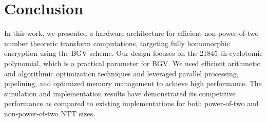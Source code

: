 \documentclass[lettersize,journal]{IEEEtran}
\begin{document}
\section{Conclusion}
In this work, we presented a hardware architecture for efficient non-power-of-two number theoretic transform computations, targeting fully homomorphic encryption using the BGV scheme. Our design focuses on the 21845-th cyclotomic polynomial, which is a practical parameter for BGV. We used efficient arithmetic
and algorithmic optimization techniques and leveraged parallel processing, pipelining, and optimized memory management to achieve high performance. The simulation and implementation results have demonstrated its competitive performance as compared to existing implementations for both power-of-two and non-power-of-two NTT sizes.


%



\newpage

 
\vfill
\end{document}
